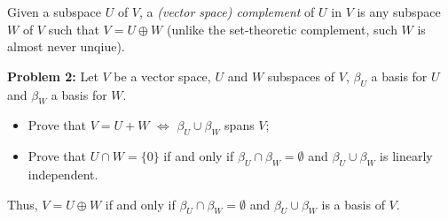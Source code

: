 \documentclass[11pt]{amsart}
\begin{document}
Given a subspace $U$ of $V$, a \emph{(vector space) complement} of $U$ in $V$ is any subspace $W$ of $V$ such that $V=U\oplus W$
(unlike the set-theoretic complement, such $W$ is almost never unqiue).
\skv

{\bf Problem 2: } Let $V$ be a vector space, $U$ and $W$ subspaces of $V$, $\beta_U$ a basis for $U$ and $\beta_W$ a basis for $W$.
\begin{itemize}
\item[(a)] Prove that $V=U+W$ $\iff$ $\beta_U\cup\beta_W$ spans $V$;
\item[(b)] Prove that $U\cap W=\{0\}$ if and only if $\beta_U\cap \beta_W=\emptyset$ and $\beta_U\cup \beta_W$ is linearly independent.
\end{itemize}
Thus, $V=U\oplus W$ if and only if $\beta_U\cap \beta_W=\emptyset$ and $\beta_U\cup \beta_W$ is a basis of $V$.
\end{document}
